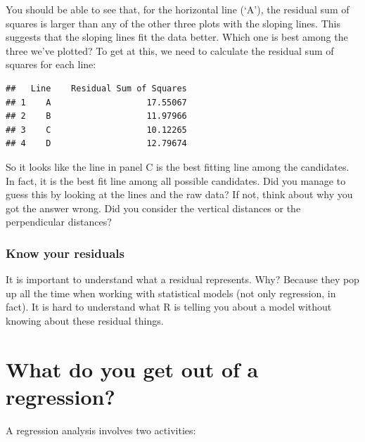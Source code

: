 \documentclass[
]{book}
\newenvironment{greybox}{
  \definecolor{shadecolor}{rgb}{0.95,0.95,0.95}  %
  \color{black}
  \begin{shaded}}
 {\end{shaded}}
\newenvironment{infobox}[1]
  {
  \begin{itemize}
  \renewcommand{\labelitemi}{
    \raisebox{-.7\height}[0pt][0pt]{
      {\setkeys{Gin}{width=3em,keepaspectratio}
        \texttt{[image: images/\#1]}}
    }
  }
  \setlength{\fboxsep}{1em}
  \begin{greybox}
  \item
  }
  {
  \end{greybox}
  \end{itemize}
  }
\begin{document}
You should be able to see that, for the horizontal line (`A'), the residual sum of squares is larger than any of the other three plots with the sloping lines. This suggests that the sloping lines fit the data better. Which one is best among the three we've plotted? To get at this, we need to calculate the residual sum of squares for each line:

\begin{verbatim}
##   Line    Residual Sum of Squares
## 1    A                   17.55067
## 2    B                   11.97966
## 3    C                   10.12265
## 4    D                   12.79674
\end{verbatim}

So it looks like the line in panel C is the best fitting line among the candidates. In fact, it is the best fit line among all possible candidates. Did you manage to guess this by looking at the lines and the raw data? If not, think about why you got the answer wrong. Did you consider the vertical distances or the perpendicular distances?

\begin{infobox}{warning}

\hypertarget{know-your-residuals}{%
\subsubsection*{Know your residuals}\label{know-your-residuals}}

It is important to understand what a residual represents. Why? Because they pop up all the time when working with statistical models (not only regression, in fact). It is hard to understand what R is telling you about a model without knowing about these residual things.

\end{infobox}

\hypertarget{what-do-you-get-out-of-a-regression}{%
\section{What do you get out of a regression?}\label{what-do-you-get-out-of-a-regression}}

A regression analysis involves two activities:
\end{document}
